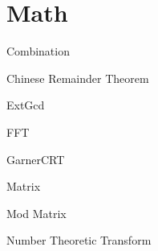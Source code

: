 \section{Math}

Combination


Chinese Remainder Theorem


ExtGcd


FFT


GarnerCRT


Matrix


Mod Matrix


Number Theoretic Transform

